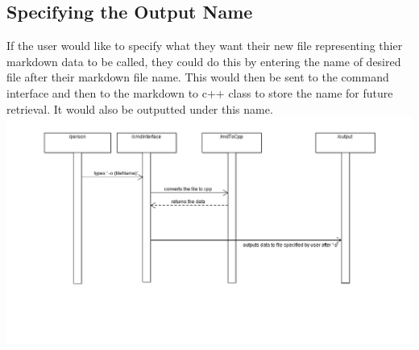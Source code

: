 \subsection{Specifying the Output Name}
If the user would like to specify what they want their new file representing thier markdown data to be called, they could do this by entering the name of desired file after their markdown file name. This would then be sent to the command interface and then to the markdown to c++ class to store the name for future retrieval. It would also be outputted under this name.
\hspace{-3cm}\includegraphics[width=500pt]{images/SpecifyingOutputName.png}
